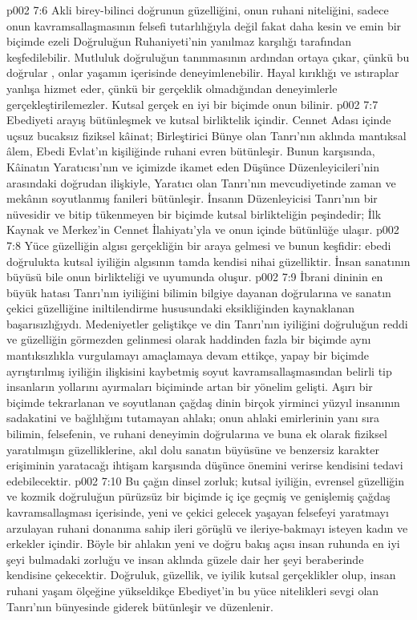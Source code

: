 \vs p002 7:6 Akli birey\hyp{}bilinci doğrunun güzelliğini, onun ruhani niteliğini, sadece onun kavramsallaşmasının felsefi tutarlılığıyla değil fakat daha kesin ve emin bir biçimde ezeli Doğruluğun Ruhaniyeti’nin yanılmaz karşılığı tarafından keşfedilebilir. Mutluluk doğruluğun tanınmasının ardından ortaya çıkar, çünkü bu doğrular , onlar yaşamın içerisinde deneyimlenebilir. Hayal kırıklığı ve ıstıraplar yanlışa hizmet eder, çünkü bir gerçeklik olmadığından deneyimlerle gerçekleştirilemezler. Kutsal gerçek en iyi bir biçimde onun bilinir.
\vs p002 7:7 Ebediyeti arayış bütünleşmek ve kutsal birliktelik içindir. Cennet Adası içinde uçsuz bucaksız fiziksel kâinat; Birleştirici Bünye olan Tanrı’nın aklında mantıksal âlem, Ebedi Evlat’ın kişiliğinde ruhani evren bütünleşir. Bunun karşısında, Kâinatın Yaratıcısı’nın ve içimizde ikamet eden Düşünce Düzenleyicileri’nin arasındaki doğrudan ilişkiyle, Yaratıcı olan Tanrı’nın mevcudiyetinde zaman ve mekânın soyutlanmış fanileri bütünleşir. İnsanın Düzenleyicisi Tanrı’nın bir nüvesidir ve bitip tükenmeyen bir biçimde kutsal birlikteliğin peşindedir; İlk Kaynak ve Merkez’in Cennet İlahiyatı’yla ve onun içinde bütünlüğe ulaşır.
\vs p002 7:8 Yüce güzelliğin algısı gerçekliğin bir araya gelmesi ve bunun keşfidir: ebedi doğrulukta kutsal iyiliğin algısının tamda kendisi nihai güzelliktir. İnsan sanatının büyüsü bile onun birlikteliği ve uyumunda oluşur.
\vs p002 7:9 İbrani dininin en büyük hatası Tanrı’nın iyiliğini bilimin bilgiye dayanan doğrularına ve sanatın çekici güzelliğine iniltilendirme hususundaki eksikliğinden kaynaklanan başarısızlığıydı. Medeniyetler geliştikçe ve din Tanrı’nın iyiliğini doğruluğun reddi ve güzelliğin görmezden gelinmesi olarak haddinden fazla bir biçimde aynı mantıksızlıkla vurgulamayı amaçlamaya devam ettikçe, yapay bir biçimde ayrıştırılmış iyiliğin ilişkisini kaybetmiş soyut kavramsallaşmasından belirli tip insanların yollarını ayırmaları biçiminde artan bir yönelim gelişti. Aşırı bir biçimde tekrarlanan ve soyutlanan çağdaş dinin birçok yirminci yüzyıl insanının sadakatini ve bağlılığını tutamayan ahlakı; onun ahlaki emirlerinin yanı sıra bilimin, felsefenin, ve ruhani deneyimin doğrularına ve buna ek olarak fiziksel yaratılmışın güzelliklerine, akıl dolu sanatın büyüsüne ve benzersiz karakter erişiminin yaratacağı ihtişam karşısında düşünce önemini verirse kendisini tedavi edebilecektir.
\vs p002 7:10 Bu çağın dinsel zorluk; kutsal iyiliğin, evrensel güzelliğin ve kozmik doğruluğun pürüzsüz bir biçimde iç içe geçmiş ve genişlemiş çağdaş kavramsallaşması içerisinde, yeni ve çekici gelecek yaşayan felsefeyi yaratmayı arzulayan ruhani donanıma sahip ileri görüşlü ve ileriye\hyp{}bakmayı isteyen kadın ve erkekler içindir. Böyle bir ahlakın yeni ve doğru bakış açısı insan ruhunda en iyi şeyi bulmadaki zorluğu ve insan aklında güzele dair her şeyi beraberinde kendisine çekecektir. Doğruluk, güzellik, ve iyilik kutsal gerçeklikler olup, insan ruhani yaşam ölçeğine yükseldikçe Ebediyet’in bu yüce nitelikleri sevgi olan Tanrı’nın bünyesinde giderek bütünleşir ve düzenlenir.
